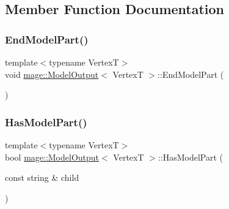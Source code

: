 \subsection{Member Function Documentation}
\hypertarget{structmage_1_1_model_output_a5df0c4240b1fac61ac0cdbf9766bb98d}{}\label{structmage_1_1_model_output_a5df0c4240b1fac61ac0cdbf9766bb98d} 
\subsubsection{\texorpdfstring{End\+Model\+Part()}{EndModelPart()}}
{\footnotesize\ttfamily template$<$typename VertexT$>$ \\
void \hyperlink{structmage_1_1_model_output}{mage\+::\+Model\+Output}$<$ VertexT $>$\+::End\+Model\+Part (\begin{DoxyParamCaption}{ }\end{DoxyParamCaption})}

\hypertarget{structmage_1_1_model_output_a23ce6e3b252227781c173149b76e73ee}{}\label{structmage_1_1_model_output_a23ce6e3b252227781c173149b76e73ee} 
\subsubsection{\texorpdfstring{Has\+Model\+Part()}{HasModelPart()}}
{\footnotesize\ttfamily template$<$typename VertexT$>$ \\
bool \hyperlink{structmage_1_1_model_output}{mage\+::\+Model\+Output}$<$ VertexT $>$\+::Has\+Model\+Part (\begin{DoxyParamCaption}\item[{const string \&}]{child }\end{DoxyParamCaption})}

\hypertarget{structmage_1_1_model_output_ada52bf380c0259a0d7ef855457e5a9da}{}\label{structmage_1_1_model_output_ada52bf380c0259a0d7ef855457e5a9da} 
